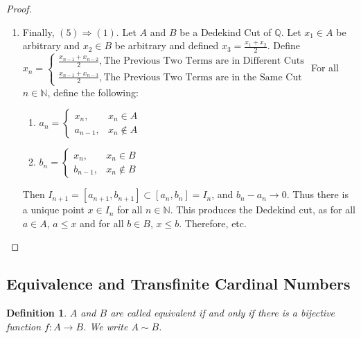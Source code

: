 \documentclass[oneside]{book}
\theoremstyle{mystyle}
\newtheorem{definition}{Definition}[section]
\begin{document}
\begin{proof}
\begin{enumerate}
\item Finally, $(5)\Rightarrow (1)$. Let $A$ and $B$ be a Dedekind Cut of $\mathbb{Q}$. Let $x_1 \in A$ be arbitrary and $x_2 \in B$ be arbitrary and defined $x_3 = \frac{x_1+x_2}{2}$. Define\\ $x_n = \begin{cases} \frac{x_{n-1}+x_{n-2}}{2}, \textrm{The Previous Two Terms are in Different Cuts}\\\frac{x_{n-1}+x_{n-3}}{2}, \textrm{The Previous Two Terms are in the Same Cut}\end{cases}$
For all $n\in \mathbb{N}$, define the following:
\begin{paracol}{2}
\begin{enumerate}
\item $a_n = \begin{cases} x_n, & x_n \in A \\ a_{n-1}, & x_n \notin A\end{cases}$
\switchcolumn
\item $b_n = \begin{cases} x_n, & x_n \in B \\ b_{n-1}, & x_n \notin B\end{cases}$
\end{enumerate}
\end{paracol}
Then $I_{n+1} = [a_{n+1},b_{n+1}] \subset [a_n,b_n]=I_n$, and $b_n-a_n \rightarrow 0$. Thus there is a unique point $x\in I_n$ for all $n\in \mathbb{N}$. This produces the Dedekind cut, as for all $a\in A$, $a\leq x$ and for all $b\in B$, $x\leq b$. Therefore, etc.
\end{enumerate}
\end{proof}
%
\subsection{Equivalence and Transfinite Cardinal Numbers}
%
\begin{definition}
$A$ and $B$ are called equivalent if and only if there is a bijective function $f:A\rightarrow B$. We write $A\sim B$.
\end{definition}
\end{document}
